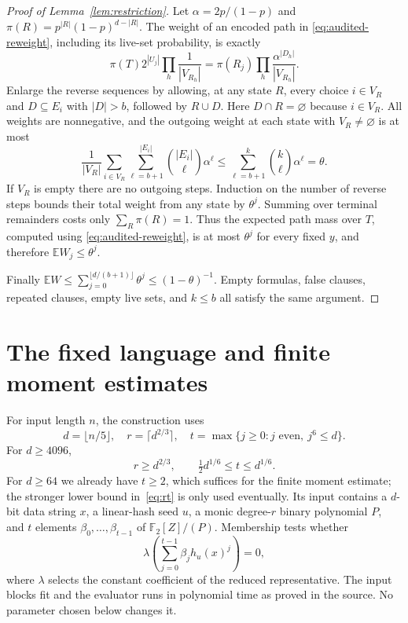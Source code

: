 \documentclass[11pt]{article}
\newcommand{\E}{\mathbb E}
\begin{document}
\begin{proof}[Proof of Lemma~\ref{lem:restriction}]
Let $\alpha=2p/(1-p)$ and
$\pi(R)=p^{|R|}(1-p)^{d-|R|}$. The weight of an encoded path in
\eqref{eq:audited-reweight}, including its live-set probability, is exactly
\[
 \pi(T)2^{|U_j|}\prod_h\frac1{|V_{R_h}|}
   =\pi(R_j)\prod_h\frac{\alpha^{|D_h|}}{|V_{R_h}|}.
\]
Enlarge the reverse sequences by allowing, at any state $R$, every choice
$i\in V_R$ and $D\subseteq E_i$ with $|D|>b$, followed by $R\cup D$.
Here $D\cap R=\varnothing$ because $i\in V_R$.
All weights are nonnegative, and the outgoing weight at each state with
$V_R\ne\varnothing$ is at most
\[
 \frac1{|V_R|}\sum_{i\in V_R}
          \sum_{\ell=b+1}^{|E_i|}\binom{|E_i|}{\ell}\alpha^\ell
 \le\sum_{\ell=b+1}^k\binom{k}{\ell}\alpha^\ell=\theta.
\]
If $V_R$ is empty there are no outgoing steps. Induction on the number
of reverse steps bounds their total weight from any state by $\theta^j$.
Summing over terminal remainders costs only
$\sum_R\pi(R)=1$. Thus the expected path mass over $T$, computed using
\eqref{eq:audited-reweight}, is at most $\theta^j$ for every fixed $y$, and
therefore $\E W_j\le\theta^j$.

Finally $\E W\le\sum_{j=0}^{\lfloor d/(b+1)\rfloor}\theta^j
\le(1-\theta)^{-1}$. Empty formulas, false clauses, repeated clauses,
empty live sets, and $k\le b$ all satisfy the same argument.
\end{proof}

\section{The fixed language and finite moment estimates}

For input length $n$, the construction uses
\[
 d=\lfloor n/5\rfloor,\quad r=\lceil d^{2/3}\rceil,\quad
 t=\max\{j\ge0:j\text{ even},\ j^6\le d\}.
\]
For $d\ge4096$,
\begin{equation}\label{eq:rt}
 r\ge d^{2/3},\qquad \tfrac12d^{1/6}\le t\le d^{1/6}.
\end{equation}
For $d\ge64$ we already have $t\ge2$, which suffices for the finite
moment estimate; the stronger lower bound in~\eqref{eq:rt} is only used
eventually.
Its input contains a $d$-bit data string $x$, a linear-hash seed $u$,
a monic degree-$r$ binary polynomial $P$, and $t$ elements
$\beta_0,\ldots,\beta_{t-1}$ of $\mathbb F_2[Z]/(P)$.
Membership tests whether
\[
 \lambda\!\left(\sum_{j=0}^{t-1}\beta_jh_u(x)^j\right)=0,
\]
where $\lambda$ selects the constant coefficient of the reduced
representative. The input blocks fit and the evaluator runs in polynomial
time as proved in the source. No parameter chosen below changes it.
\end{document}
